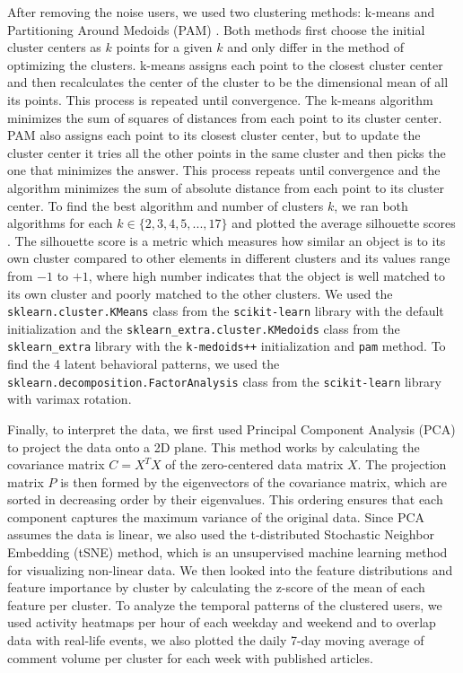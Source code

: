 \documentclass[11pt,a4paper]{article}
\begin{document}
After removing the noise users, we used two clustering methods: k-means \cite{Hartigan1979} and Partitioning Around Medoids (PAM) \cite{Kaufman2009}. Both methods first choose the initial cluster centers as $k$ points for a given $k$ and only differ in the method of optimizing the clusters. k-means \cite{Hartigan1979} assigns each point to the closest cluster center and then recalculates the center of the cluster to be the dimensional mean of all its points. This process is repeated until convergence. The k-means algorithm minimizes the sum of squares of distances from each point to its cluster center. PAM \cite{Kaufman2009} also assigns each point to its closest cluster center, but to update the cluster center it tries all the other points in the same cluster and then picks the one that minimizes the answer. This process repeats until convergence and the algorithm minimizes the sum of absolute distance from each point to its cluster center. To find the best algorithm and number of clusters $k$, we ran both algorithms for each $k \in \{2, 3, 4, 5, ..., 17\}$ and plotted the average silhouette scores \cite{Rousseeuw1987}. The silhouette score \cite{Rousseeuw1987} is a metric which measures how similar an object is to its own cluster compared to other elements in different clusters and its values range from $-1$ to $+1$, where high number indicates that the object is well matched to its own cluster and poorly matched to the other clusters. We used the \texttt{sklearn.cluster.KMeans} class from the \texttt{scikit-learn} library \cite{Pedregosa2011} with the default initialization and the \texttt{sklearn\_extra.cluster.KMedoids} class from the \texttt{sklearn\_extra} library with the \texttt{k-medoids++} initialization and \texttt{pam} method. To find the 4 latent behavioral patterns, we used the \texttt{sklearn.decomposition.FactorAnalysis} class from the \texttt{scikit-learn} library \cite{Pedregosa2011} with varimax rotation.

Finally, to interpret the data, we first used Principal Component Analysis (PCA) \cite{Pearson1901} to project the data onto a 2D plane. This method works by calculating the covariance matrix $C=X^TX$ of the zero-centered data matrix $X$. The projection matrix $P$ is then formed by the eigenvectors of the covariance matrix, which are sorted in decreasing order by their eigenvalues. This ordering ensures that each component captures the maximum variance of the original data. Since PCA assumes the data is linear, we also used the t-distributed Stochastic Neighbor Embedding (tSNE) \cite{Maaten2008} method, which is an unsupervised machine learning method for visualizing non-linear data. We then looked into the feature distributions and feature importance by cluster by calculating the z-score of the mean of each feature per cluster. To analyze the temporal patterns of the clustered users, we used activity heatmaps per hour of each weekday and weekend and to overlap data with real-life events, we also plotted the daily 7-day moving average of comment volume per cluster for each week with published articles.
\end{document}
